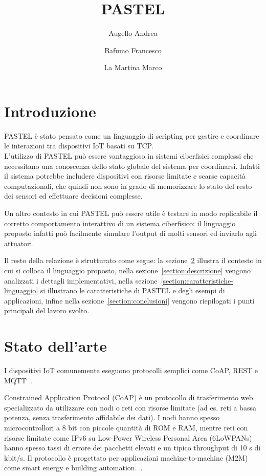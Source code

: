 \documentclass[10pt]{article}
\title{PASTEL}
\author{{Augello Andrea} \and {Bafumo Francesco} \and{La Martina Marco}}
\begin{document}
\maketitle
\tableofcontents
\clearpage

\section{Introduzione}
PASTEL è stato pensato come un linguaggio di scripting per gestire e coordinare le interazioni tra dispositivi IoT basati su TCP.\\
L'utilizzo di PASTEL può essere vantaggioso in sistemi ciberfisici complessi che necessitano una conoscenza dello stato globale del sistema per coordinarsi. Infatti il sistema potrebbe includere dispositivi con risorse limitate e scarse capacità computazionali, che quindi non sono in grado di memorizzare lo stato del resto dei sensori ed effettuare decisioni complesse. 

Un altro contesto in cui PASTEL può essere utile è testare in modo replicabile il corretto comportamento interattivo di un sistema ciberfisico: il linguaggio proposto infatti può facilmente simulare l'output di molti sensori ed inviarlo agli attuatori.

Il resto della relazione è strutturato come segue: la sezione~\ref{section:stato-arte} illustra il contesto in cui si colloca il linguaggio proposto, nella sezione~\ref{section:descrizione} vengono analizzati i dettagli implementativi, nella sezione~\ref{section:caratteristiche-linguaggio} si illustrano le caratteristiche di PASTEL e degli esempi di applicazioni, infine nella sezione~\ref{section:conclusioni} vengono riepilogati i punti principali del lavoro svolto.

\section{Stato dell'arte}\label{section:stato-arte}

I dispositivi IoT comunemente eseguono protocolli semplici come CoAP, REST e MQTT~\cite{tandale2017empirical}. 

Constrained Application Protocol (CoAP) è un   protocollo di trasferimento web specializzato da utilizzare con nodi o reti con risorse limitate (ad es. reti a bassa potenza, senza trasferimento affidabile dei dati). I nodi hanno spesso microcontrollori  a 8 bit con piccole quantità di ROM e RAM, mentre reti con risorse limitate come IPv6 su Low-Power Wireless Personal Area  (6LoWPANs) hanno spesso tassi di errore dei pacchetti elevati e un tipico throughput di 10 s di kbit/s. Il protocollo è progettato per applicazioni  machine-to-machine (M2M) come smart energy e building automation.~\cite{shelby2014constrained}.
\end{document}
